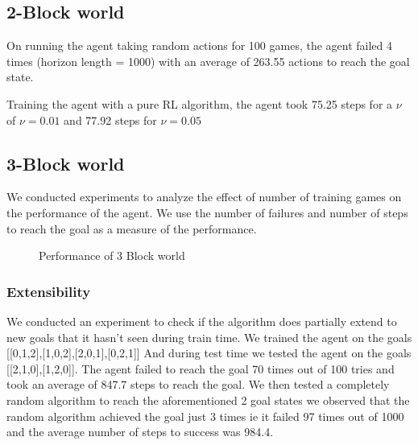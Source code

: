 \documentclass[letterpaper, 12 pt, conference]{ieeeconf}
\begin{document}
\subsection{2-Block world}
On running the agent taking random actions for 100 games, the agent failed 4 times (horizon length = 1000) with an average of 263.55 actions to reach the goal state.

Training the agent with a pure RL algorithm, the agent took 75.25 steps for a $\nu$ of $\nu = 0.01$ and 77.92 steps for $\nu = 0.05$


\subsection{3-Block world}

We conducted experiments to analyze the effect of number of training games on the performance of the agent. We use the number of failures and number of steps to reach the goal as a measure of the performance.


\begin{figure}
\caption{Performance of 3 Block world} 
\label{perf}
\end{figure}


\subsubsection{Extensibility}

We conducted an experiment to check if the algorithm does partially extend to new goals that it hasn’t seen during train time. We trained the agent on the goals [[0,1,2],[1,0,2],[2,0,1],[0,2,1]]
And during test time we tested the agent on the goals [[2,1,0],[1,2,0]]. The agent failed to reach the goal 70 times out of 100 tries and took an average of 847.7 steps to reach the goal.
We then tested a completely random algorithm to reach the aforementioned 2 goal states we observed that the random algorithm achieved the goal just 3 times ie it failed 97 times out of 1000 and the average number of steps to success was 984.4. 
\end{document}
